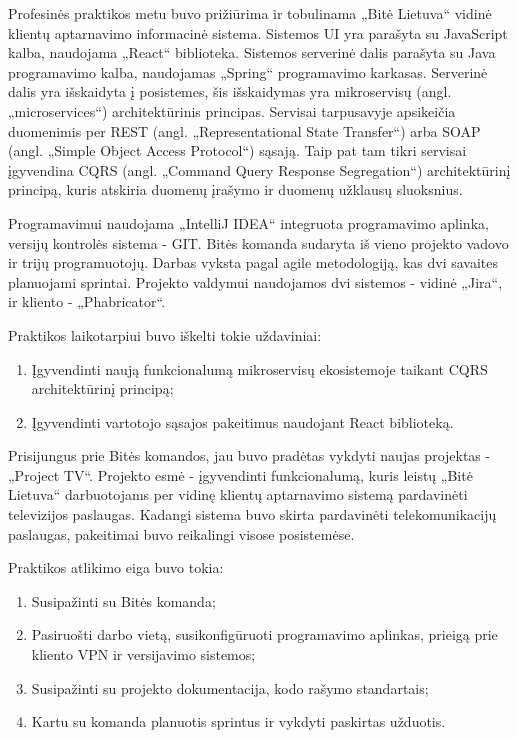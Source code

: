 \smallskip

Profesinės praktikos metu buvo prižiūrima ir tobulinama „Bitė Lietuva“ vidinė klientų aptarnavimo informacinė sistema. Sistemos UI yra parašyta su JavaScript kalba,
naudojama „React“ biblioteka. Sistemos serverinė dalis parašyta su Java programavimo kalba, naudojamas „Spring“ programavimo karkasas. Serverinė dalis yra išskaidyta į
posistemes, šis išskaidymas yra mikroservisų (angl. „microservices“) architektūrinis principas. Servisai tarpusavyje apsikeičia duomenimis per
REST (angl. „Representational State Transfer“) arba SOAP (angl. „Simple Object Access Protocol“) sąsają. Taip pat tam tikri servisai įgyvendina
CQRS (angl. „Command Query Response Segregation“) architektūrinį principą, kuris atskiria duomenų įrašymo ir duomenų užklausų sluoksnius.

Programavimui naudojama „IntelliJ IDEA“ integruota programavimo aplinka, versijų kontrolės sistema - GIT. Bitės komanda sudaryta iš vieno projekto vadovo ir trijų programuotojų.
Darbas vyksta pagal agile metodologiją, kas dvi savaites planuojami sprintai. Projekto valdymui naudojamos dvi sistemos - vidinė „Jira“, ir kliento - „Phabricator“.

\smallskip
Praktikos laikotarpiui buvo iškelti tokie uždaviniai:
\begin{enumerate}
    \item Įgyvendinti naują funkcionalumą mikroservisų ekosistemoje taikant CQRS architektūrinį principą;
    \item Įgyvendinti vartotojo sąsajos pakeitimus naudojant React biblioteką.
\end{enumerate}

\smallskip
Prisijungus prie Bitės komandos, jau buvo pradėtas vykdyti naujas projektas - „Project TV“. Projekto esmė - įgyvendinti funkcionalumą, kuris leistų „Bitė Lietuva“ darbuotojams
per vidinę klientų aptarnavimo sistemą pardavinėti televizijos paslaugas. Kadangi sistema buvo skirta pardavinėti telekomunikacijų paslaugas,
pakeitimai buvo reikalingi visose posistemėse.

\smallskip
Praktikos atlikimo eiga buvo tokia:
\begin{enumerate}
    \item Susipažinti su Bitės komanda;
    \item Pasiruošti darbo vietą, susikonfigūruoti programavimo aplinkas, prieigą prie kliento VPN ir versijavimo sistemos;
    \item Susipažinti su projekto dokumentacija, kodo rašymo standartais;
    \item Kartu su komanda planuotis sprintus ir vykdyti paskirtas užduotis.
\end{enumerate}

